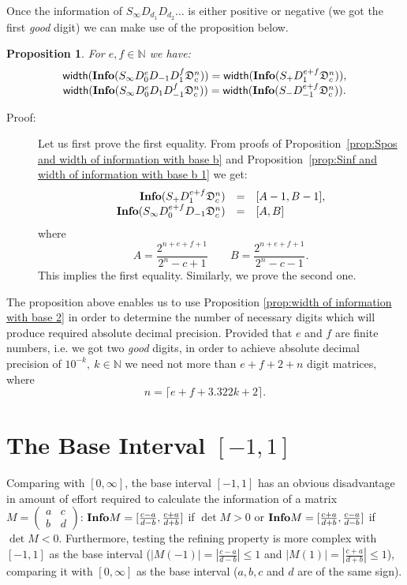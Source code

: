 \documentclass[11pt,a4paper]{article}
\newtheorem{prop}[tm]{Proposition}
\newenvironment{proof}
	{ \begin{description} \item[Proof:] \footnotesize }
	{ \end{description} }
\begin{document}
Once the information of $S_\infty D_{d_1} D_{d_2} \ldots$ is either
	positive or negative (we got the first {\em good} digit) we can make
	use of the proposition below.
	\begin{prop} For $e,f \in \mathbb{N}$ we have:
		\[ \begin{array}{c}
			{\sf width} ( {\bf Info} ( S_\infty D_0^e D_{-1} D_1^f
				\mathfrak{D}_c^n ) ) = {\sf width} ( {\bf Info} ( S_+ D_1^{e+f}
				\mathfrak{D}_c^n ) ), \\
			{\sf width} ( {\bf Info} ( S_\infty D_0^e D_1 D_{-1}^f
			\mathfrak{D}_c^n ) ) = {\sf width} ( {\bf Info} ( S_- D_{-1}^{e+f}
			\mathfrak{D}_c^n ) ).
		\end{array} \]
	\end{prop}
	\begin{proof}
		Let us first prove the first equality. From proofs of
		Proposition~\ref{prop:Spos and width of information with base b} and
		Proposition~\ref{prop:Sinf and width of information with base b 1} we get:
		\[ \begin{array}{rcl}
			{\bf Info} (S_+ D_1^{e+f} \mathfrak{D}_c^n) &=& [A-1,B-1], \\
			{\bf Info} (S_\infty D_0^{e+f} D_{-1} \mathfrak{D}_c^n )
				&=& [A,B]
		\end{array} \]
		where
		\[ A=\frac{2^{n+e+f+1}}{2^n-c+1} \qquad B=\frac{2^{n+e+f+1}}{2^n-c-1}. \]
		This implies the first equality. Similarly, we prove the second one.
	\end{proof}
	The proposition above enables us to use Proposition \ref{prop:width of
	information with base 2} in order to determine the number of necessary
	digits which will produce required absolute decimal precision.
	Provided that $e$ and $f$ are finite numbers, i.e. we got two {\em good}
	digits, in order to achieve absolute decimal precision of $10^{-k},\ k
	\in \mathbb{N}$ we need not more than $e+f+2+n$ digit matrices, where
	\[ n = \lceil e+f+ 3.322k + 2 \rceil. \]


\section{The Base Interval $[-1,1]$}
Comparing with $[0,\infty]$, the base interval $[-1,1]$ has an obvious
	disadvantage in amount of effort required to calculate the information
	of a matrix $M=\begin{pmatrix} a&c\\b&d \end{pmatrix}$: ${\bf Info}M=
	[\frac{c-a}{d-b},\frac{c+a}{d+b}]$ if $\det M > 0$ or ${\bf Info}M=
	[\frac{c+a}{d+b}, \frac{c-a}{d-b}]$ if $\det M < 0$. Furthermore,
	testing the refining property is more complex with $[-1,1]$ as the
	base interval ($|M(-1)| = |\frac{c-a}{d-b}| \le 1$ and $|M(1)| =
	|\frac{c+a}{d+b}| \le 1$), comparing it with $[0,\infty]$ as the base
	interval ($a,b,c$ and $d$ are of the same sign).
\end{document}

